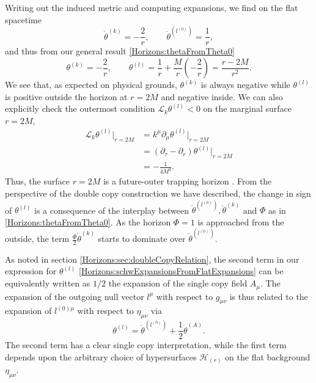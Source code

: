 Writing out the induced metric and computing expansions, we find on the flat spacetime
\begin{equation}  
    \mathring{\theta}^{(k)} = -\frac{2}{r}, \qquad \mathring{\theta}^{(l^{(0)})} = \frac{1}{r},
\end{equation}
and thus from our general result \eqref{Horizons:thetaFromTheta0}
\begin{equation} \label{Horizons:schwExpansionsFromFlatExpansions} 
    \theta^{(k)} = - \frac{2}{r}, \qquad \theta^{(l)} = \frac{1}{r} + \frac{M}{r} \left(- \frac{2}{r}\right)
    = \frac{r-2M}{r^{2}}.
\end{equation}
We see that, as expected on physical grounds, $\theta^{(k)}$ is always negative while $\theta^{(l)}$ is positive
outside the horizon at $r = 2M$ and negative inside. We can also explicitly check the outermost condition $\mathcal{L}_{k} \theta^{(l)} < 0$ on the marginal surface $r = 2M$,
\begin{equation}
    \begin{split}
        \mathcal{L}_{k} \theta^{(l)} \big\vert_{r = 2M}
        &= k^{\mu} \partial_{\mu} \theta^{(l)} \big\vert_{r = 2M} \\
        &= \left( \partial_{\tau} - \partial_{r} \right) \theta^{(l)} \big\vert_{r = 2M} \\
        &= - \frac{1}{4M^{2}}.
    \end{split}
\end{equation}
Thus, the surface $r = 2M$ is a future-outer trapping horizon \cite{Hayward:1993wb}.
From the perspective of the double copy construction we have
described, the change in sign of $\theta^{(l)}$ is a consequence of the interplay between
$\mathring{\theta}^{(l^{(0)})}, \mathring{\theta}^{(k)}$ and $\Phi$ as in \eqref{Horizons:thetaFromTheta0}. As the horizon
$\Phi = 1$ is approached from the outside, the term $\frac{\Phi}{2} \mathring{\theta}^{(k)}$ starts to dominate over
$\mathring{\theta}^{(l^{(0)})}$.  

As noted in section \ref{Horizons:sec:doubleCopyRelation}, the second term in our expression for $\theta^{(l)}$
\eqref{Horizons:schwExpansionsFromFlatExpansions} can be equivalently written as $1 / 2$ the expansion of the single copy
field $A_{\mu}$. The expansion of the outgoing null vector $l^{\mu}$ with respect to $g_{\mu \nu}$ is thus related
to the expansion of $l^{(0) \mu}$ with respect to $\eta_{\mu \nu}$ via
\begin{equation}  
    \theta^{(l)} = \mathring{\theta}^{(l^{(0)})} + \frac{1}{2} \mathring{\theta}^{(A)}.
\end{equation}
The second term has a clear single copy interpretation, while the first term depends upon the arbitrary choice of
hypersurfaces $\mathcal{H}_{(r)}$ on the flat background $\eta_{\mu \nu}$.

